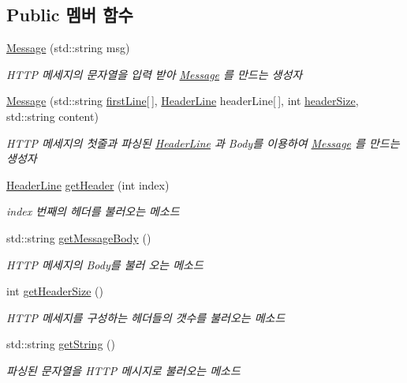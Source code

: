 \subsection*{Public 멤버 함수}
\begin{DoxyCompactItemize}
\item 
\hyperlink{classhttp_1_1_message_af708fe5d0db7f88afe44665ddcf2205a}{Message} (std\+::string msg)
\begin{DoxyCompactList}\small\item\em H\+T\+TP 메세지의 문자열을 입력 받아 \hyperlink{classhttp_1_1_message}{Message} 를 만드는 생성자 \end{DoxyCompactList}\item 
\hyperlink{classhttp_1_1_message_a3b0418444366710791deda1abe0f9f9f}{Message} (std\+::string \hyperlink{classhttp_1_1_message_a56420a38395db02e6bc33bf27a6c7769}{first\+Line}\mbox{[}$\,$\mbox{]}, \hyperlink{structhttp_1_1_header_line}{Header\+Line} header\+Line\mbox{[}$\,$\mbox{]}, int \hyperlink{classhttp_1_1_message_abf4fab93257b3d37930ed20627f1c061}{header\+Size}, std\+::string content)
\begin{DoxyCompactList}\small\item\em H\+T\+TP 메세지의 첫줄과 파싱된 \hyperlink{structhttp_1_1_header_line}{Header\+Line} 과 Body를 이용하여 \hyperlink{classhttp_1_1_message}{Message} 를 만드는 생성자 \end{DoxyCompactList}\item 
\hyperlink{structhttp_1_1_header_line}{Header\+Line} \hyperlink{classhttp_1_1_message_a8f81090365d2147e31cc750498b846e7}{get\+Header} (int index)
\begin{DoxyCompactList}\small\item\em index 번째의 헤더를 불러오는 메소드 \end{DoxyCompactList}\item 
std\+::string \hyperlink{classhttp_1_1_message_a23c2c7bdf00670719c5493742f38eaa3}{get\+Message\+Body} ()
\begin{DoxyCompactList}\small\item\em H\+T\+TP 메세지의 Body를 불러 오는 메소드 \end{DoxyCompactList}\item 
int \hyperlink{classhttp_1_1_message_a5904d9972df76c1bc751d1bb352c3849}{get\+Header\+Size} ()
\begin{DoxyCompactList}\small\item\em H\+T\+TP 메세지를 구성하는 헤더들의 갯수를 불러오는 메소드 \end{DoxyCompactList}\item 
std\+::string \hyperlink{classhttp_1_1_message_a4bc25a6f276e17cd9975ecdaa0d4093a}{get\+String} ()
\begin{DoxyCompactList}\small\item\em 파싱된 문자열을 H\+T\+TP 메시지로 불러오는 메소드 \end{DoxyCompactList}\end{DoxyCompactItemize}
